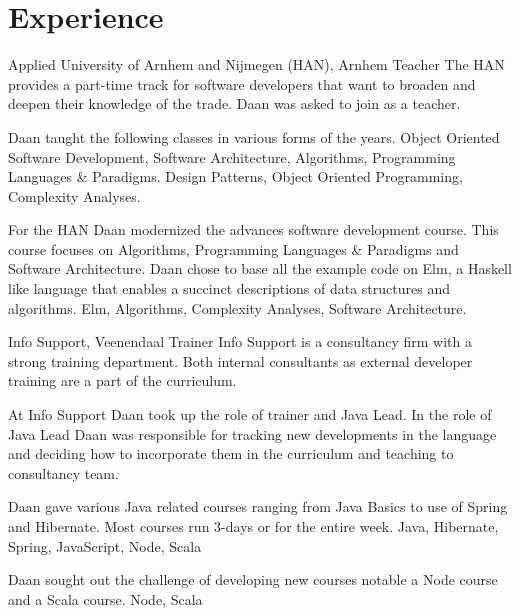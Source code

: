 \section*{Experience}
  \begin{workExperience}{Applied University of Arnhem and Nijmegen (HAN), Arnhem}%
  {Teacher}{}
  The HAN provides a part-time track for software developers that want to
  broaden and deepen their knowledge of the trade. Daan was asked to join as a
  teacher. 

  Daan taught the following classes in various forms of the years. Object
  Oriented Software Development, Software Architecture, Algorithms, Programming
  Languages \& Paradigms.
  \technics Design Patterns, Object Oriented Programming, Complexity Analyses.

  For the HAN Daan modernized the advances software development course. This
  course focuses on Algorithms, Programming Languages \& Paradigms and Software
  Architecture.
  Daan chose to base all the example code on Elm, a Haskell like language that
  enables a succinct descriptions of data structures and algorithms.
  \technics Elm, Algorithms, Complexity Analyses, Software Architecture.

  \end{workExperience}

  \begin{workExperience}{Info Support, Veenendaal}%
  {Trainer}{}
  Info Support is a consultancy firm with a strong training department. Both
  internal consultants as external developer training are a part of the curriculum.

  At Info Support Daan took up the role of trainer and Java Lead. In the role of
  Java Lead Daan was responsible for tracking new developments in the language
  and deciding how to incorporate them in the curriculum and teaching to
  consultancy team. 

  Daan gave various Java related courses ranging from Java Basics to use of
  Spring and Hibernate. Most courses run 3-days or for the entire week.
  \technics Java, Hibernate, Spring, JavaScript, Node, Scala

  Daan sought out the challenge of developing new courses notable a Node course
  and a Scala course.
  \technics Node, Scala

  \end{workExperience}

